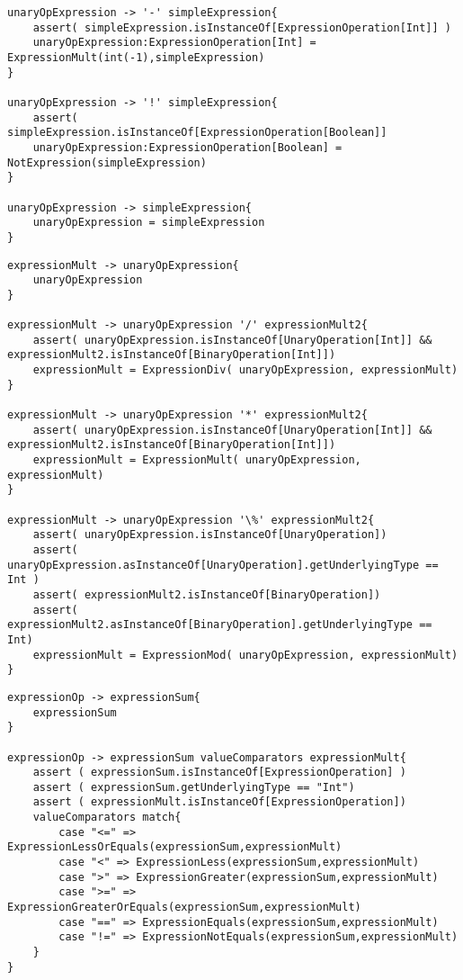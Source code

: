 \documentclass[12pt,letterpaper]{article}
\begin{document}
\begin{lstlisting}
unaryOpExpression -> '-' simpleExpression{
	assert( simpleExpression.isInstanceOf[ExpressionOperation[Int]] )
	unaryOpExpression:ExpressionOperation[Int] = ExpressionMult(int(-1),simpleExpression)
}

unaryOpExpression -> '!' simpleExpression{
	assert( simpleExpression.isInstanceOf[ExpressionOperation[Boolean]]
	unaryOpExpression:ExpressionOperation[Boolean] = NotExpression(simpleExpression)
}

unaryOpExpression -> simpleExpression{
	unaryOpExpression = simpleExpression
}
\end{lstlisting}

\begin{lstlisting}
expressionMult -> unaryOpExpression{
	unaryOpExpression
}

expressionMult -> unaryOpExpression '/' expressionMult2{
	assert( unaryOpExpression.isInstanceOf[UnaryOperation[Int]] && expressionMult2.isInstanceOf[BinaryOperation[Int]])	
	expressionMult = ExpressionDiv( unaryOpExpression, expressionMult)
}

expressionMult -> unaryOpExpression '*' expressionMult2{
	assert( unaryOpExpression.isInstanceOf[UnaryOperation[Int]] && expressionMult2.isInstanceOf[BinaryOperation[Int]])	
	expressionMult = ExpressionMult( unaryOpExpression, expressionMult)
}

expressionMult -> unaryOpExpression '\%' expressionMult2{
	assert( unaryOpExpression.isInstanceOf[UnaryOperation])
	assert( unaryOpExpression.asInstanceOf[UnaryOperation].getUnderlyingType == Int )
	assert( expressionMult2.isInstanceOf[BinaryOperation])
	assert( expressionMult2.asInstanceOf[BinaryOperation].getUnderlyingType == Int)	
	expressionMult = ExpressionMod( unaryOpExpression, expressionMult)
}
\end{lstlisting}

\begin{lstlisting}
expressionOp -> expressionSum{
	expressionSum
}

expressionOp -> expressionSum valueComparators expressionMult{
	assert ( expressionSum.isInstanceOf[ExpressionOperation] )
	assert ( expressionSum.getUnderlyingType == "Int")
	assert ( expressionMult.isInstanceOf[ExpressionOperation])
	valueComparators match{
	    case "<=" => ExpressionLessOrEquals(expressionSum,expressionMult)
	    case "<" => ExpressionLess(expressionSum,expressionMult)
	    case ">" => ExpressionGreater(expressionSum,expressionMult)
	    case ">=" => ExpressionGreaterOrEquals(expressionSum,expressionMult)
     	case "==" => ExpressionEquals(expressionSum,expressionMult)
	    case "!=" => ExpressionNotEquals(expressionSum,expressionMult)
    }
}
\end{lstlisting}
\end{document}
